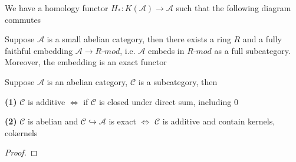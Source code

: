 \documentclass[../main.tex]{subfiles}
\begin{document}
\begin{theorem}
We have a homology functor $H_*:K(\mathscr A)\to\mathscr A$ such that the following diagram commutes
\begin{center}
\end{center}
\end{theorem}

\begin{theorem}
Suppose $\mathscr A$ is a small abelian category, then there exists a ring $R$ and a fully faithful embedding $\mathscr A\to R$-$mod$, i.e. $\mathscr A$ embeds in $R$-$mod$ as a full subcategory. Moreover, the embedding is an exact functor
\end{theorem}

\begin{lemma}
Suppose $\mathscr A$ is an abelian category, $\mathscr C$ is a subcategory, then \par
\textbf{(1) }$\mathscr C$ is additive $\Leftrightarrow$ if $\mathscr C$ is closed under direct sum, including $0$ \par
\textbf{(2) }$\mathscr C$ is abelian and $\mathscr C\hookrightarrow\mathscr A$ is exact $\Leftrightarrow$ $\mathscr C$ is additive and contain kernels, cokernels
\end{lemma}

\begin{proof}

\end{proof}
\end{document}
